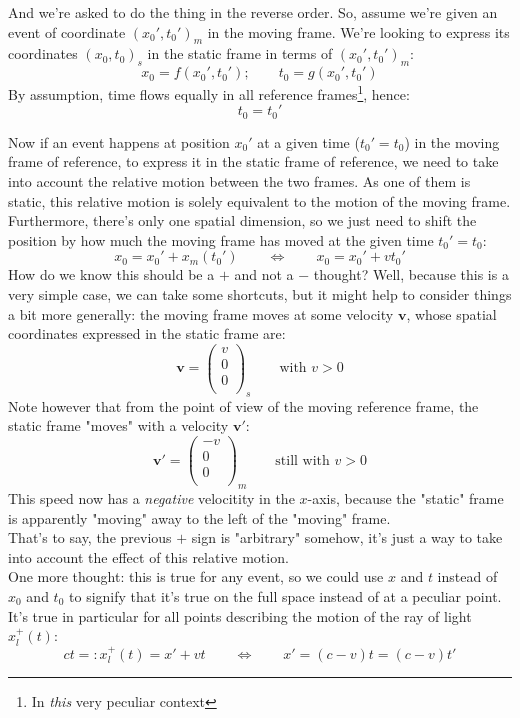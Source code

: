 \documentclass[solutions.tex]{subfiles}
\begin{document}
And we're asked to do the thing in the reverse order. So, assume we're
given an event of coordinate $(x_0', t_0')_m$ in the moving frame. We're
looking to express its coordinates $(x_0, t_0)_s$ in the static frame
in terms of $(x_0', t_0')_m$:
\[
	x_0 = f(x_0', t_0');\qquad t_0 = g(x_0', t_0')
\]
By assumption, time flows equally in all reference frames\footnote{In
\textit{this} very peculiar context}, hence:
\[
	\boxed{t_0 = t_0'}
\]

Now if an event happens at position $x_0'$ at a given time ($t_0'=t_0$)
in the moving frame of reference, to express it in the static frame of
reference, we need to take into account the relative motion between
the two frames. As one of them is static, this relative motion is solely
equivalent to the motion of the moving frame. Furthermore,
there's only one spatial dimension, so we just need to shift the position
by how much the moving frame has moved at the given time $t_0'=t_0$:
\[
	x_0 = x_0'+x_m(t_0')\qquad\Leftrightarrow\qquad
	\boxed{x_0 = x_0'+vt_0'}
\]
How do we know this should be a $+$ and not a $-$ thought? Well, because
this is a very simple case, we can take some shortcuts, but it might
help to consider things a bit more generally: the moving frame moves
at some velocity $\bm{v}$, whose spatial coordinates expressed in the
static frame are:
\[
	\bm{v} = \begin{pmatrix}
		v \\
		0 \\
		0 \\
	\end{pmatrix}_s\qquad\text{with } v > 0
\]
Note however that from the point of view of the moving reference frame,
the static frame "moves" with a velocity $\bm{v}'$:
\[
	\bm{v}' = \begin{pmatrix}
		-v \\
		0 \\
		0 \\
	\end{pmatrix}_m\qquad\text{still with } v > 0
\]
This speed now has a \textit{negative} velocitity in the $x$-axis, because
the "static" frame is apparently "moving" away to the left of the "moving"
frame. \\

That's to say, the previous $+$ sign is "arbitrary" somehow, it's just a way
to take into account the effect of this relative motion. \\

One more thought: this is true for any event, so we could use $x$ and
$t$ instead of $x_0$ and $t_0$ to signify that it's true on the full space
instead of at a peculiar point. It's true in particular for all points
describing the motion of the ray of light $x^+_l(t)$:
\[
	ct =: x^+_l(t) = x' + vt\qquad\Leftrightarrow\qquad
		x' = (c-v)t = (c-v)t'
\]

\end{document}
